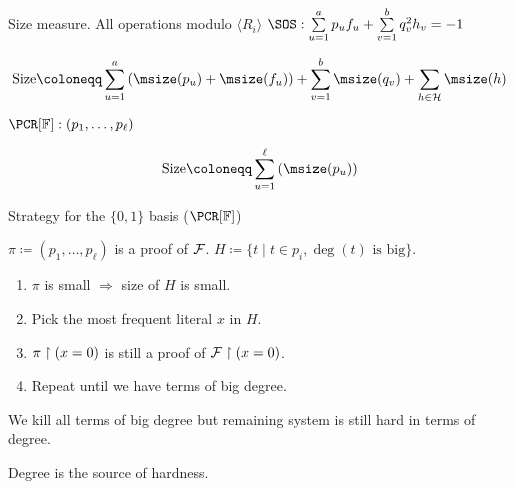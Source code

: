 \begin{frame}{Size measure. All operations modulo $\langle R_i \rangle$}
    \pause
    $\SOS: \sum\limits_{u = 1}^{a} p_u f_u + \sum\limits_{v = 1}^{b} q_v^2 h_v = -1$

    $$
    \text{Size} \coloneqq \sum_{u = 1}^{a} \left( \msize(p_u) + \msize(f_u) \right) +
    \sum_{v = 1}^{b} \msize(q_v) + \sum_{h \in \Hs} \msize(h)
    $$
        
    \vspace{1cm}
    $\PCR[\field]: (p_1, \dots, p_{\ell})$
    
    $$
    \text{Size} \coloneqq \sum_{u = 1}^{\ell} \left( \msize(p_u) \right)
    $$
\end{frame}


\begin{frame}{Strategy for the $\{0, 1\}$ basis ($\PCR[\field]$)}
    
    $\pi \coloneqq (p_1, \dots, p_{\ell})$ is a proof of $\mathcal{F}$. $H \coloneqq \{t \mid t \in p_i, \deg(t)
    \text{ is big}\}$.

    \begin{enumerate}
        \item $\pi$ is small $\Rightarrow$ size of $H$ is small.
        \pause
        \item Pick the most frequent literal $x$ in $H$.
        \pause
        \pause
        \item $\pi \upharpoonright (x = 0)$ is still a proof of $\mathcal{F} \upharpoonright (x = 0)$.
        \pause
        \pause
        \pause    
        \item Repeat until we have terms of big degree.
    \end{enumerate}

    \vspace{0.3cm}
    \pause
    We kill all terms of big degree but remaining system is still hard in terms of degree.

    \vspace{0.3cm}
    \pause
    \begin{center}
        \Huge Degree is the source of hardness.
    \end{center}
\end{frame}


